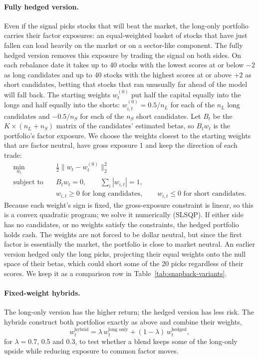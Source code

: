 \documentclass[12pt,letterpaper]{article}
\begin{document}
\paragraph{Fully hedged version.} Even if the signal picks stocks that will beat the market, the long-only portfolio carries their factor exposures: an equal-weighted basket of stocks that have just fallen can load heavily on the market or on a sector-like component. The fully hedged version removes this exposure by trading the signal on both sides. On each rebalance date it takes up to 40 stocks with the lowest scores at or below $-2$ as long candidates and up to 40 stocks with the highest scores at or above $+2$ as short candidates, betting that stocks that ran unusually far ahead of the model will fall back. The starting weights $w^{(0)}_t$ put half the capital equally into the longs and half equally into the shorts: $w^{(0)}_{i,t} = 0.5 / n_L$ for each of the $n_L$ long candidates and $-0.5 / n_S$ for each of the $n_S$ short candidates. Let $B_t$ be the $K \times (n_L + n_S)$ matrix of the candidates' estimated betas, so $B_t w_t$ is the portfolio's factor exposure. We choose the weights closest to the starting weights that are factor neutral, have gross exposure 1 and keep the direction of each trade:
\[
\begin{aligned}
\min_{w_t} \quad & \tfrac{1}{2} \lVert w_t - w^{(0)}_t \rVert_2^2 \\
\text{subject to} \quad & B_t w_t = 0, \qquad \textstyle\sum_i |w_{i,t}| = 1, \\
& w_{i,t} \ge 0 \text{ for long candidates}, \qquad w_{i,t} \le 0 \text{ for short candidates}.
\end{aligned}
\]
Because each weight's sign is fixed, the gross-exposure constraint is linear, so this is a convex quadratic program; we solve it numerically (SLSQP). If either side has no candidates, or no weights satisfy the constraints, the hedged portfolio holds cash. The weights are not forced to be dollar neutral, but since the first factor is essentially the market, the portfolio is close to market neutral. An earlier version hedged only the long picks, projecting their equal weights onto the null space of their betas, which could short some of the 20 picks regardless of their scores. We keep it as a comparison row in Table~\ref{tab:snapback-variants}.

\paragraph{Fixed-weight hybrids.} The long-only version has the higher return; the hedged version has less risk. The hybrids construct both portfolios exactly as above and combine their weights,
\[
    w_t^{\text{hybrid}} = \lambda\, w_t^{\text{long only}} + (1 - \lambda)\, w_t^{\text{hedged}},
\]
for $\lambda = 0.7$, 0.5 and 0.3, to test whether a blend keeps some of the long-only upside while reducing exposure to common factor moves.
\end{document}
